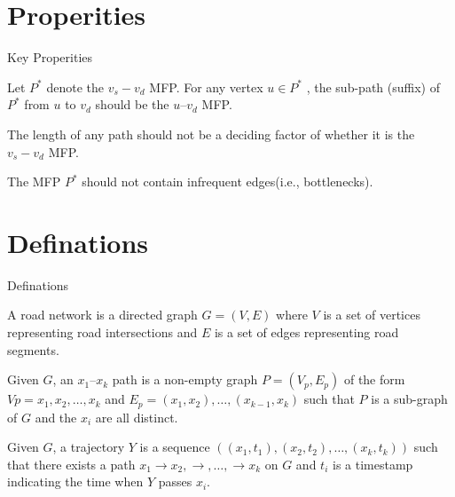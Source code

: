 \documentclass[mathserif]{beamer}
\begin{document}
\section{Properities}
\begin{frame}{Key Properities}
	\begin{property}
	Let $P^*$ denote the $v_s-v_d$ MFP. For any vertex $u \in P^*$ , the sub-path (suffix) of $P^*$ from $u$ to $v_d$ should be the $u–v_d$ MFP.
	\end{property}
	\begin{property}
	The length of any path should not be a deciding factor of whether it is the $v_s-v_d$ MFP.
	\end{property}
	\begin{property}
	The MFP $P^*$ should not contain infrequent edges(i.e., bottlenecks).
	\end{property}
\end{frame}

\section{Definations}
\begin{frame}{Definations}
\begin{defination}
A road network is a directed graph $G = (V, E)$ where $V$ is a set of vertices representing road intersections and $E$ is a set of edges representing road segments.
\end{defination}
\begin{defination}
Given $G$, an $x_1–x_k$ path is a non-empty graph $P = (V_p, E_p)$ of the form $Vp = {x_1, x_2,\ldots{}, x_k}$ and $E_p = {(x_1, x_2),\ldots , (x_{k−1}, x_k)}$ such that $P$ is a sub-graph of $G$ and the $x_i$ are all distinct.
\end{defination}
\begin{defination}
Given $G$, a trajectory $Y$ is a sequence $((x_1, t_1), (x_2, t_2), \ldots , (x_k, t_k))$ such that there exists a path $x_1 \to{} x_2,\to{},\dots,\to{} x_k$ on $G$ and $t_i$ is a timestamp indicating the time when $Y$ passes $x_i$.
\end{defination}
\end{frame}
\end{document}
